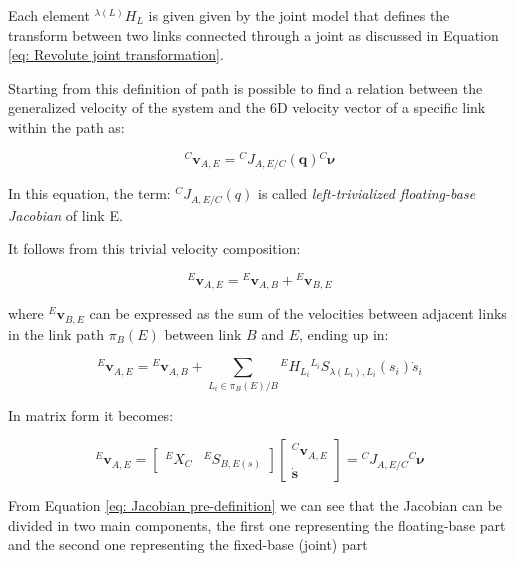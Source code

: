    Each element ${}^{\lambda(L)} {H}_{L}$ is given given by the joint model that defines the transform between two links connected through a joint as discussed in Equation \eqref{eq: Revolute joint transformation}.

    Starting from this definition of path is possible to find a relation between the generalized velocity of the system and the 6D velocity vector of a specific link within the path as:

    \begin{equation}
        {}^{C} \mathbf{v}_{A,E} = {}^{C}J_{A,E/C}( \mathbf{q}) {}^{C}\bm{\nu}
    \label{eq: First Jacobian definition}
    \end{equation}

    In this equation, the term: ${}^{C}J_{A,E/C}( {q})$ is called \textit{left-trivialized floating-base Jacobian} of link E.

    It follows from this trivial velocity composition:

    \begin{equation}
        {}^{E} \mathbf{v}_{A,E} = {}^{E} \mathbf{v}_{A,B} + {}^{E} \mathbf{v}_{B,E}
    \label{eq: Jacobian derivation starting point}
    \end{equation}

    where ${}^{E} \mathbf{v}_{B,E}$ can be expressed as the sum of the velocities between adjacent links in the link path $\pi_B(E)$ between link $B$ and $E$, ending up in: 

    \begin{equation}
        {}^{E} \mathbf{v}_{A,E} = {}^{E} \mathbf{v}_{A,B} + \sum_{L_i \in \pi_B(E)/B} {}^{E}H_{L_i}{}^{L_i}S_{\lambda(L_i),L_i}(s_i)\dot{s}_i
    \end{equation}

    In matrix form it becomes:

    \begin{equation}
        {}^{E} \mathbf{v}_{A,E} = \begin{bmatrix}
            {}^{E}X_C & {}^{E}S_{B,E( {s})}
        \end{bmatrix} \begin{bmatrix} 
            {}^{C} \mathbf{v}_{A,E} \\
            \dot{\mathbf{s}}
        \end{bmatrix} = {}^{C}J_{A,E/C}{}^{C}\bm{\nu}
    \label{eq: Jacobian pre-definition}
    \end{equation}

    From Equation \eqref{eq: Jacobian pre-definition} we can see that the Jacobian can be divided in two main components, the first one representing the floating-base part and the second one representing the fixed-base (joint) part


